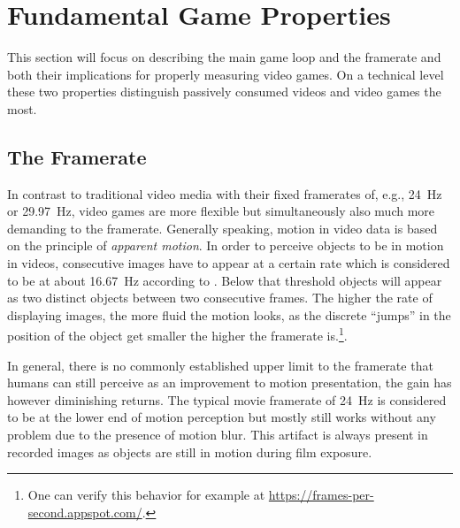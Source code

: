 \section{Fundamental Game Properties}
\label{sec:gamemechanics}

This section will focus on describing the main game loop and the 
framerate and both their implications for properly measuring video 
games. On a technical level these two properties distinguish passively 
consumed videos and video games the most.


\subsection{The Framerate}
\label{sec:framerate}

In contrast to traditional video media with their fixed framerates of, 
e.g., \SI{24}{\hertz} or \SI{29.97}{\hertz}, video games are more 
flexible but simultaneously also much more demanding to the framerate. 
Generally speaking, motion in video data is based on the principle of 
\textit{apparent motion}. In order to perceive objects to be in motion 
in videos, consecutive images have to appear at a certain rate which is 
considered to be at about \SI{16.67}{\hertz} according to 
\cite{wertheimer1912experimentelle}. Below that threshold objects will 
appear as two distinct objects between two consecutive frames.
The higher the rate of displaying images, the more fluid the motion 
looks, as the discrete ``jumps'' in the position of the object get 
smaller the higher the framerate is.\footnote{One can verify this 
behavior for example at \url{https://frames-per-second.appspot.com/}.}.

In general, there is no commonly established upper limit to the 
framerate that humans can still perceive as an improvement to motion 
presentation, the gain has however diminishing returns. The typical 
movie framerate of \SI{24}{\hertz} is considered to be at the lower end 
of motion perception but mostly still works without any problem due to 
the presence of motion blur. This artifact is always present in 
recorded images as objects are still in motion during film exposure.

